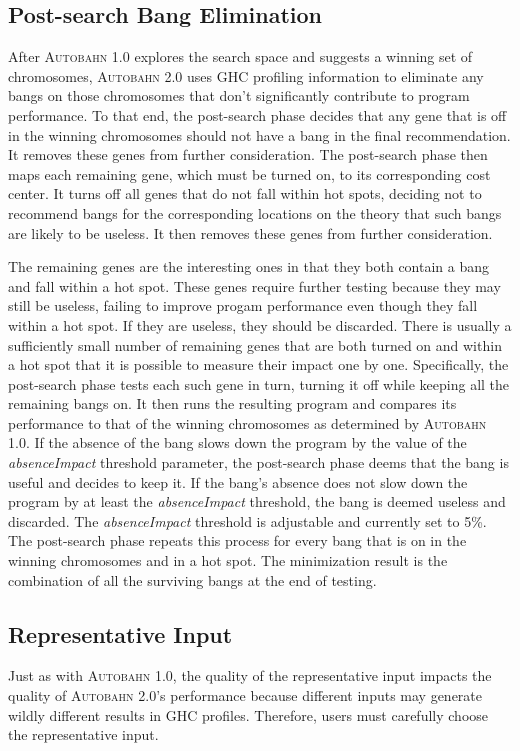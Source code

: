 \documentclass[format=sigplan, review=true]{acmart}
\newcommand{\hotspot}[0]{hot spot}
\newcommand{\hotspots}[0]{hot spots}
\newcommand{\useless}[0]{useless}
\newcommand{\Ao}[0]{\textsc{Autobahn 1.0}}
\newcommand{\At}[0]{\textsc{Autobahn 2.0}}
\newcommand{\postopt}[0]{post-search}
\newcommand{\Postopt}[0]{Post-search}
\newcommand{\absim}[0]{\textit{absenceImpact}}
\begin{document}
\subsection{\Postopt{} Bang Elimination}

After \Ao{} explores the search space and suggests a winning set of
chromosomes, \At{} uses GHC profiling information to eliminate any
bangs on those chromosomes that don't significantly contribute to
program performance. To that end, 
the \postopt{} phase decides that any gene that is off in the winning
chromosomes should not have a bang in the final recommendation.
It removes these genes from further consideration. 
The \postopt{} phase then maps each remaining gene, which must be
turned on, to its corresponding cost center.  It turns off all genes
that do not fall within \hotspots{}, deciding not to recommend bangs
for the corresponding locations on the theory that such bangs are
likely to be \useless{}.  It then removes these genes from further
consideration. 

The remaining genes are the interesting ones in that they both
contain a bang and fall within a \hotspot{}. These genes require
further testing because they may still be \useless{}, failing to
improve progam performance even though they fall within a \hotspot{}.
If they are \useless{}, they should be discarded. 
There is usually a sufficiently small number of remaining genes that
are both turned on and within a \hotspot{} that it is possible to
measure their impact one by one.  Specifically, 
the \postopt{} phase tests each such gene in turn, turning
it off while keeping all the remaining bangs on.  It 
then runs the resulting program and compares its performance to that
of the winning chromosomes as determined by \Ao{}.
If the absence of the bang slows down the program by the value of the \absim{}
threshold parameter, the \postopt{} phase deems that the bang is useful and
decides to keep it. 
If the bang's absence does not slow down the program by at
least the \absim{} threshold, the bang is deemed \useless{} and
discarded. The \absim{} threshold is adjustable and currently set to
5\%. The \postopt{} phase repeats this process for every bang
that is on in the winning chromosomes and in a \hotspot{}. 
The  minimization result is the combination of all the surviving
bangs at the end of testing.

\subsection{Representative Input}
Just as with \Ao{}, the quality of the representative input impacts the quality of
\At{}'s performance because different inputs may
generate wildly different results in GHC profiles. Therefore, users
must carefully choose the representative input.
\end{document}

